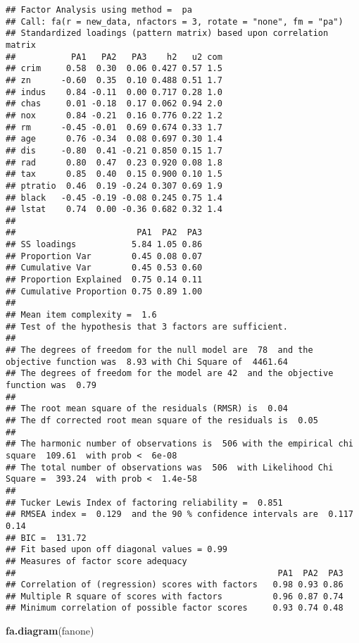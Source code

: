 \documentclass[
]{article}
\newenvironment{Shaded}{\begin{snugshade}}{\end{snugshade}}
\newcommand{\KeywordTok}[1]{\textcolor[rgb]{0.13,0.29,0.53}{\textbf{#1}}}
\newcommand{\NormalTok}[1]{#1}
\begin{document}
\begin{verbatim}
## Factor Analysis using method =  pa
## Call: fa(r = new_data, nfactors = 3, rotate = "none", fm = "pa")
## Standardized loadings (pattern matrix) based upon correlation matrix
##           PA1   PA2   PA3    h2   u2 com
## crim     0.58  0.30  0.06 0.427 0.57 1.5
## zn      -0.60  0.35  0.10 0.488 0.51 1.7
## indus    0.84 -0.11  0.00 0.717 0.28 1.0
## chas     0.01 -0.18  0.17 0.062 0.94 2.0
## nox      0.84 -0.21  0.16 0.776 0.22 1.2
## rm      -0.45 -0.01  0.69 0.674 0.33 1.7
## age      0.76 -0.34  0.08 0.697 0.30 1.4
## dis     -0.80  0.41 -0.21 0.850 0.15 1.7
## rad      0.80  0.47  0.23 0.920 0.08 1.8
## tax      0.85  0.40  0.15 0.900 0.10 1.5
## ptratio  0.46  0.19 -0.24 0.307 0.69 1.9
## black   -0.45 -0.19 -0.08 0.245 0.75 1.4
## lstat    0.74  0.00 -0.36 0.682 0.32 1.4
## 
##                        PA1  PA2  PA3
## SS loadings           5.84 1.05 0.86
## Proportion Var        0.45 0.08 0.07
## Cumulative Var        0.45 0.53 0.60
## Proportion Explained  0.75 0.14 0.11
## Cumulative Proportion 0.75 0.89 1.00
## 
## Mean item complexity =  1.6
## Test of the hypothesis that 3 factors are sufficient.
## 
## The degrees of freedom for the null model are  78  and the objective function was  8.93 with Chi Square of  4461.64
## The degrees of freedom for the model are 42  and the objective function was  0.79 
## 
## The root mean square of the residuals (RMSR) is  0.04 
## The df corrected root mean square of the residuals is  0.05 
## 
## The harmonic number of observations is  506 with the empirical chi square  109.61  with prob <  6e-08 
## The total number of observations was  506  with Likelihood Chi Square =  393.24  with prob <  1.4e-58 
## 
## Tucker Lewis Index of factoring reliability =  0.851
## RMSEA index =  0.129  and the 90 % confidence intervals are  0.117 0.14
## BIC =  131.72
## Fit based upon off diagonal values = 0.99
## Measures of factor score adequacy             
##                                                    PA1  PA2  PA3
## Correlation of (regression) scores with factors   0.98 0.93 0.86
## Multiple R square of scores with factors          0.96 0.87 0.74
## Minimum correlation of possible factor scores     0.93 0.74 0.48
\end{verbatim}

\begin{Shaded}
\begin{Highlighting}[]
\KeywordTok{fa.diagram}\NormalTok{(fanone)}
\end{Highlighting}
\end{Shaded}
\end{document}
